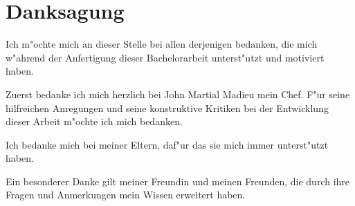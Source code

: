 \chapter{Danksagung}
Ich m"ochte mich an dieser Stelle bei allen derjenigen bedanken, die mich w"ahrend der Anfertigung dieser Bachelorarbeit unterst"utzt und motiviert haben.

Zuerst bedanke ich mich herzlich bei John Martial Madieu mein Chef. F"ur seine hilfreichen Anregungen und seine konstruktive Kritiken bei der Entwicklung dieser Arbeit m"ochte ich mich bedanken.

Ich bedanke mich bei meiner Eltern, daf"ur das sie mich immer unterst"utzt haben.

Ein besonderer Danke gilt meiner Freundin und meinen Freunden, die durch ihre Fragen und Anmerkungen mein Wissen erweitert haben.\\
\\[6ex]
 
%
%
